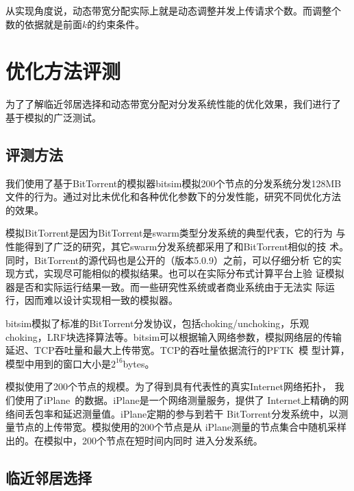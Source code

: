 
从实现角度说，动态带宽分配实际上就是动态调整并发上传请求个数。而调整个
数的依据就是前面$k$的约束条件。

\section{优化方法评测}
\label{sec:bteval}

为了了解临近邻居选择和动态带宽分配对分发系统性能的优化效果，我们进行了
基于模拟的广泛测试。

\subsection{评测方法}

我们使用了基于BitTorrent的模拟器bitsim模拟200个节点的分发系统分发128MB
文件的行为。通过对比未优化和各种优化参数下的分发性能，研究不同优化方法
的效果。

模拟BitTorrent是因为BitTorrent是swarm类型分发系统的典型代表，它的行为
与性能得到了广泛的研究，其它swarm分发系统都采用了和BitTorrent相似的技
术。同时，BitTorrent的源代码也是公开的（版本5.0.9）之前，可以仔细分析
它的实现方式，实现尽可能相似的模拟结果。也可以在实际分布式计算平台上验
证模拟器是否和实际运行结果一致。而一些研究性系统或者商业系统由于无法实
际运行，因而难以设计实现相一致的模拟器。

bitsim模拟了标准的BitTorrent分发协议，包括choking/unchoking，乐观
choking，LRF块选择算法等。bitsim可以根据输入网络参数，模拟网络层的传输
延迟、TCP吞吐量和最大上传带宽。TCP的吞吐量依据流行的PFTK~\cite{pftk}模
型计算，模型中用到的窗口大小是$2^{16}$bytes。

模拟使用了200个节点的规模。为了得到具有代表性的真实Internet网络拓扑，
我们使用了iPlane~\cite{iplane}的数据。iPlane是一个网络测量服务，提供了
Internet上精确的网络间丢包率和延迟测量值。iPlane定期的参与到若干
BitTorrent分发系统中，以测量节点的上传带宽。模拟使用的200个节点是从
iPlane测量的节点集合中随机采样出的。在模拟中，200个节点在短时间内同时
进入分发系统。



\subsection{临近邻居选择}


